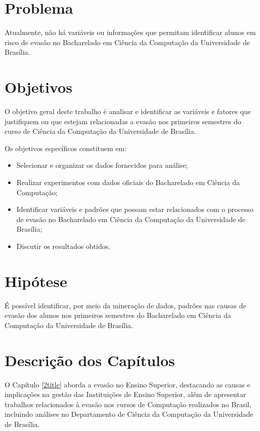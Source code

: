 \section{Problema} \label{1title6}

Atualmente, não há variáveis ou informações que permitam identificar alunos em risco de evasão no Bacharelado em Ciência da Computação da Universidade de Brasília.

\section{Objetivos} \label{1title2}

O objetivo geral deste trabalho é analisar e identificar as variáveis e fatores que justifiquem ou que estejam relacionadas a evasão nos primeiros semestres do curso de Ciência da Computação da Universidade de Brasília.


Os objetivos específicos constituem em:
\begin{itemize}
	\item Selecionar e organizar os dados fornecidos para análise;
	\item Realizar experimentos com dados oficiais do Bacharelado em Ciência da Computação;
	\item Identificar variáveis e padrões que possam estar relacionados com o processo de evasão no Bacharelado em Ciência da Computação da Universidade de Brasília;
	\item Discutir os resultados obtidos.     
\end{itemize}


\section{Hipótese} \label{1title3}
É possível identificar, por meio da mineração de dados, padrões nas causas de evasão dos alunos nos primeiros semestres do Bacharelado em Ciência da Computação da Universidade de Brasília.


\section{Descrição dos Capítulos} \label{1title5}

O Capítulo \ref{2title} aborda a evasão no Ensino Superior, destacando as causas e implicações na gestão das Instituições de Ensino Superior, além de apresentar trabalhos relacionados à evasão nos cursos de Computação realizados no Brasil, incluindo análises no Departamento de Ciência da Computação da Universidade de Brasília.

